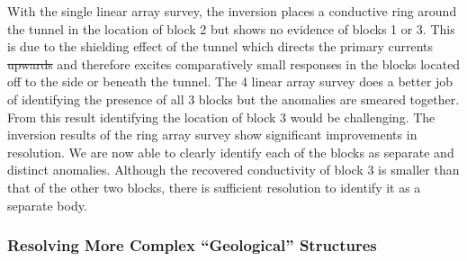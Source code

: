 \documentclass[preprint,authoryear,12pt]{elsarticle}
\providecommand{\DIFaddtex}[1]{{\protect\color{blue}\uwave{#1}}} %
\providecommand{\DIFdeltex}[1]{{\protect\color{red}\sout{#1}}}                      %
\providecommand{\DIFaddbegin}{} %
\providecommand{\DIFaddend}{} %
\providecommand{\DIFdelbegin}{} %
\providecommand{\DIFdelend}{} %
\providecommand{\DIFadd}[1]{\texorpdfstring{\DIFaddtex{#1}}{#1}} %
\providecommand{\DIFdel}[1]{\texorpdfstring{\DIFdeltex{#1}}{}} %
\begin{document}
With the single linear array survey, the inversion places a conductive ring around the tunnel in the location of block 2 but shows no evidence of blocks 1 or 3. This is due to the shielding effect of the tunnel which directs the primary currents \DIFdelbegin \DIFdel{upwards }\DIFdelend \DIFaddbegin \DIFadd{upward }\DIFaddend and therefore excites comparatively small responses in the blocks located off to the side or beneath the tunnel. The 4 linear array survey does a better job of identifying the presence of all 3 blocks but the anomalies are smeared together. From this result identifying the location of block 3 would be challenging. The inversion results of the ring array survey show significant improvements in resolution. We are now able to clearly identify each of the blocks as separate and distinct anomalies. Although the recovered conductivity of block 3 is smaller than that of the other two blocks, there is sufficient resolution to identify it as a separate body.


\subsubsection{Resolving More Complex ``Geological'' Structures}
\label{sec:RingArray_Development_Straight_Synth_GeologicalTarget}

\DIFdelbegin %
\end{document}
